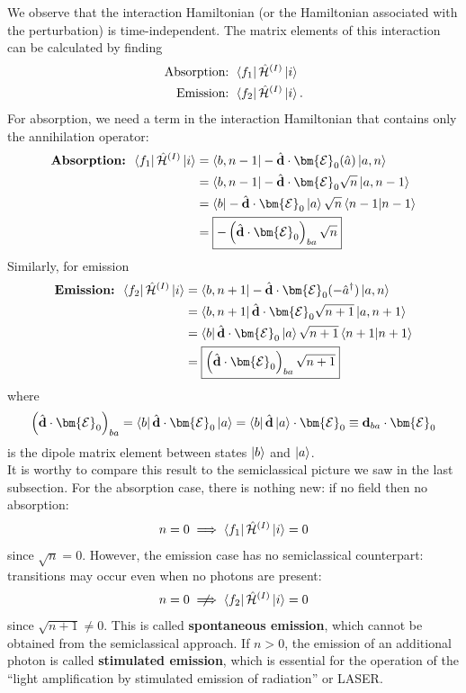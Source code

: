 \documentclass{book}
\theoremstyle{definition}
\newcommand{\ham}{\mathcal{H}}
\newcommand{\lp}{\left(}
\newcommand{\rp}{\right)}
\begin{document}
We observe that the interaction Hamiltonian (or the Hamiltonian associated with the perturbation) is time-independent. The matrix elements of this interaction can be calculated by finding
\begin{align}
\text{Absorption: } &\bra{f_1}\hat{\ham}^{(I)}\ket{i}\\
\text{Emission: } &\bra{f_2}\hat{\ham}^{(I)}\ket{i}.
\end{align}
For absorption, we need a term in the interaction Hamiltonian that contains only the annihilation operator:
\begin{align}
\textbf{Absorption: } \bra{f_1}\hat{\ham}^{(I)}\ket{i}
&= \bra{b, n-1}-\hat{\mathbf{d}}\cdot\bm{\mathcal{E}}_0(\hat{a})\ket{a,n}\\
&= \bra{b,n-1}-\hat{\mathbf{d}}\cdot\bm{\mathcal{E}}_0 \sqrt{n}\ket{a,n-1}\\
&= \bra{b}-\hat{\mathbf{d}}\cdot\bm{\mathcal{E}}_0\ket{a}\sqrt{n}\braket{n-1}\\
&= \boxed{-\lp \hat{\mathbf{d}}\cdot\bm{\mathcal{E}}_0 \rp_{ba}\sqrt{n}}
\end{align}
Similarly, for emission
\begin{align}
\textbf{Emission: } \bra{f_2}\hat{\ham}^{(I)}\ket{i}
&= \bra{b, n+1}-\hat{\mathbf{d}}\cdot\bm{\mathcal{E}}_0(-\hat{a}^\dagger)\ket{a,n}\\
&= \bra{b,n+1}\hat{\mathbf{d}}\cdot\bm{\mathcal{E}}_0 \sqrt{n+1}\ket{a,n+1}\\
&= \bra{b}\hat{\mathbf{d}}\cdot\bm{\mathcal{E}}_0\ket{a}\sqrt{n+1}\braket{n+1}\\
&= \boxed{\lp \hat{\mathbf{d}}\cdot\bm{\mathcal{E}}_0 \rp_{ba}\sqrt{n+1}}
\end{align}
where
\begin{align}
\lp \hat{\mathbf{d}}\cdot\bm{\mathcal{E}}_0 \rp_{ba} = \bra{b}\hat{\mathbf{d}}\cdot\bm{\mathcal{E}}_0\ket{a} = \bra{b}\hat{\mathbf{d}}\ket{a}\cdot\bm{\mathcal{E}}_0 \equiv \mathbf{d}_{ba}\cdot\bm{\mathcal{E}}_0
\end{align}
is the dipole matrix element between states $\ket{b}$ and $\ket{a}$. \\

It is worthy to compare this result to the semiclassical picture we saw in the last subsection. For the absorption case, there is nothing new: if no field then no absorption: 
\begin{align}
n=0 \implies \bra{f_1}\hat{\ham}^{(I)}\ket{i} = 0
\end{align}
since $\sqrt{n} = 0$. However, the emission case has no semiclassical counterpart: transitions may occur even when no photons are present:
\begin{align}
n=0 \centernot\implies \bra{f_2}\hat{\ham}^{(I)}\ket{i} = 0
\end{align}
since $\sqrt{n+1}\neq 0$. This is called \textbf{spontaneous emission}, which cannot be obtained from the semiclassical approach. If $n > 0$, the emission of an additional photon is called \textbf{stimulated emission}, which is essential for the operation of the ``light amplification by stimulated emission of radiation'' or LASER. \\
\end{document}
